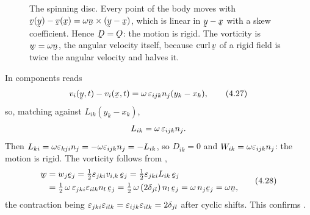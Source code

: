 \begin{figure}[htbp]\centering
{}
\caption{The spinning disc. Every point of the body moves with
$\bv(\by)-\bv(\bx)=\omega\bn\times(\by-\bx)$, which is linear in
$\by-\bx$ with a skew coefficient. Hence $\bD=\Ob$: the motion is rigid.
The vorticity is $\bw=\omega\bn$, the angular velocity itself, because
$\crl\bv$ of a rigid field is twice the angular velocity and 
halves it.}
\label{fig:disc}
\end{figure}

In components  reads
\begin{equation}
   v_{i}(\by,t)-v_{i}(\bx,t)=\omega\,\eps_{ijk}n_{j}(y_{k}-x_{k}),
   \tag{4.27}\label{eq:4.27}
\end{equation}
so, matching against $L_{ik}(y_{k}-x_{k})$,
\[
   L_{ik}=\omega\,\varepsilon_{ijk}n_{j}.
\]
Then $L_{ki}=\omega\varepsilon_{kji}n_{j}=-\omega\varepsilon_{ijk}n_{j}=-L_{ik}$, so
$D_{ik}=0$ and $W_{ik}=\omega\varepsilon_{ijk}n_{j}$: the motion is rigid. The
vorticity follows from ,
\begin{equation}
\begin{aligned}
   \bw&=w_{j}\be_{j}=\tfrac12\eps_{jki}v_{i,k}\,\be_{j}
   =\tfrac12\eps_{jki}L_{ik}\,\be_{j}\\
   &=\tfrac12\,\omega\,\eps_{jki}\eps_{ilk}n_{l}\,\be_{j}
   =\tfrac12\,\omega\,(2\dd_{jl})\,n_{l}\,\be_{j}
   =\omega\,n_{j}\be_{j}=\omega\bn ,
\end{aligned}
   \tag{4.28}\label{eq:4.28}
\end{equation}
the contraction being $\varepsilon_{jki}\varepsilon_{ilk}=\varepsilon_{ijk}\varepsilon_{ilk}
=2\delta_{jl}$ after cyclic shifts. This confirms .

